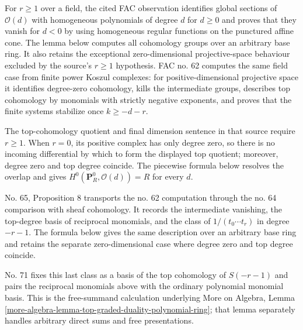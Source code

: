 \begin{lemma}
\label{lemma-cohomology-projective-space-over-ring}
\begin{reference}
\cite[III Proposition 2.1.12]{EGA}
\cite[Chapter III, \S 2, no. 54, observation following Proposition 1,
p. 247]{FAC}
\cite[Chapter III, \S 3, no. 62, Proposition 2 and Corollaries,
pp. 255--256]{FAC}
\cite[Chapter III, \S 3, no. 65, Proposition 8,
pp. 258--259]{FAC}
\cite[Chapter III, \S 4, no. 71, definition of $\Omega$ and the
free-module case of Proposition 2, pp. 264--265]{FAC}
\cite[Chapter III, \S 6, no. 80, proof of Proposition 3, p. 275]{FAC}
\end{reference}
\begin{history}
For $r \geq 1$ over a field, the cited FAC observation identifies global
sections of $\mathcal{O}(d)$ with homogeneous polynomials of degree $d$ for
$d \geq 0$ and proves that they vanish for $d < 0$ by using homogeneous
regular functions on the punctured affine cone. The lemma below computes all
cohomology groups over an arbitrary base ring. It also retains the exceptional
zero-dimensional projective-space behaviour excluded by the source's
$r \geq 1$ hypothesis. FAC no. 62 computes the same field case from finite
power Koszul complexes: for positive-dimensional projective space it
identifies degree-zero cohomology, kills the intermediate groups, describes
top cohomology by monomials with strictly negative exponents, and proves that
the finite systems stabilize once $k \geq -d-r$.

The top-cohomology quotient and final dimension sentence in that source
require $r \geq 1$. When $r = 0$, its positive complex has only degree zero,
so there is no incoming differential by which to form the displayed top
quotient; moreover, degree zero and top degree coincide. The piecewise formula
below resolves the overlap and gives
$H^0(\mathbf{P}^0_R, \mathcal{O}(d)) = R$ for every $d$.

No. 65, Proposition 8 transports the no. 62 computation through the no. 64
comparison with sheaf cohomology. It records the intermediate vanishing, the
top-degree basis of reciprocal monomials, and the class of
$1/(t_0\cdots t_r)$ in degree $-r-1$. The formula below gives the same
description over an arbitrary base ring and retains the separate
zero-dimensional case where degree zero and top degree coincide.

No. 71 fixes this last class as a basis of the top cohomology of
$S(-r-1)$ and pairs the reciprocal monomials above with the ordinary
polynomial monomial basis. This is the free-summand calculation underlying
More on Algebra, Lemma
\ref{more-algebra-lemma-top-graded-duality-polynomial-ring}; that lemma
separately handles arbitrary direct sums and free presentations.


\end{history}
\end{lemma}
